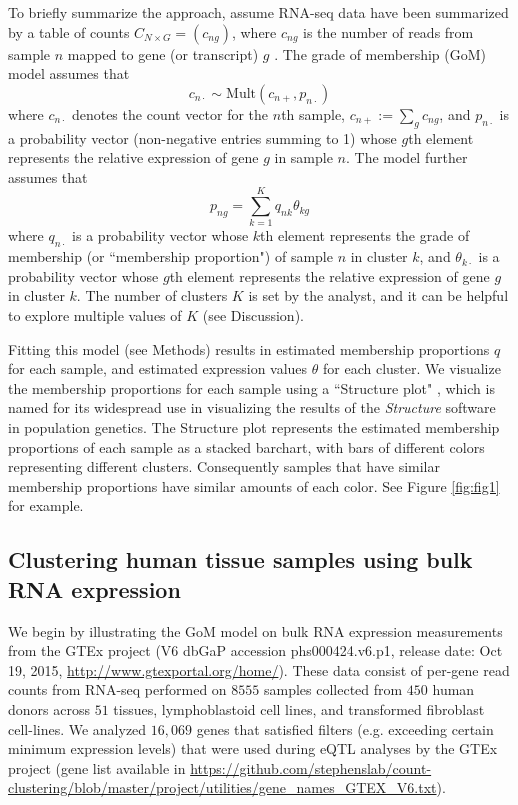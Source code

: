 To briefly summarize the approach, assume RNA-seq data have been summarized by a table of counts $C_{N \times G} = (c_{ng})$, where $c_{ng}$ is the number of reads from sample $n$ mapped to gene (or transcript) $g$ \cite{Oshlack2010}.  The grade of membership (GoM) model assumes that 
\begin{equation}
c_{n\cdot} \sim \text{Mult}(c_{n+}, p_{n\cdot})
\end{equation}
where $c_{n\cdot}$ denotes the count vector for the $n$th sample, $c_{n+} := \sum_g c_{ng}$, and $p_{n\cdot}$ is a probability vector (non-negative entries summing to 1) whose $g$th element represents the relative expression of gene $g$ in sample $n$. 
The model further assumes that 
\begin{equation}
p_{ng} = \sum_{k=1}^{K} q_{nk}\theta_{kg}    
\end{equation}
where $q_{n\cdot}$ is a probability vector whose $k$th element represents the grade of membership (or ``membership proportion") of
sample $n$ in cluster $k$, and $\theta_{k\cdot}$ is a probability vector whose $g$th element represents
the relative expression of gene $g$ in cluster $k$. The number of clusters $K$ is set by the analyst, and it can be helpful to explore multiple
values of $K$ (see Discussion).

Fitting this model (see Methods) results in estimated membership proportions $q$ for each sample, and estimated expression values $\theta$ for each cluster.
We visualize the membership proportions for each sample using a ``Structure plot" \cite{Rosenberg2002}, 
which is named for its widespread use in visualizing the
results of the {\it Structure} software \cite{Pritchard2000} in population genetics.
The Structure plot represents the estimated membership proportions of each sample 
as a stacked barchart, with bars of different colors representing  different clusters. Consequently samples that have similar membership proportions have
similar amounts of each color. See Figure \ref{fig:fig1} for example.

\subsection{Clustering human tissue samples using bulk RNA expression}

We begin by illustrating the GoM model on bulk RNA expression measurements from the GTEx project (V6 dbGaP accession phs000424.v6.p1, release date: Oct 19, 2015, \url{http://www.gtexportal.org/home/}).  These data consist of per-gene read counts from RNA-seq performed on $8555$ samples collected from $450$ human donors across $51$ tissues, lymphoblastoid cell lines, and transformed fibroblast cell-lines. We analyzed $16,069$ genes that satisfied filters (e.g. exceeding certain minimum expression levels) that were used during eQTL analyses by the GTEx project (gene list available in \url{https://github.com/stephenslab/count-clustering/blob/master/project/utilities/gene_names_GTEX_V6.txt}). 

